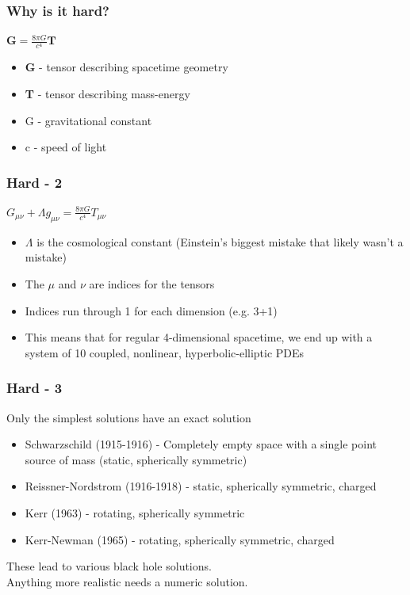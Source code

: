 \documentclass{beamer}
\begin{document}
\begin{frame}
  \frametitle{Why is it hard?}
  \begin{LARGE}
  \begin{center}
    $ \textbf{G} = \frac{8 \pi G}{c^4} \textbf{T} $
  \end{center}
  \end{LARGE}
  \begin{itemize}
    \item \textbf{G} - tensor describing spacetime geometry
    \item \textbf{T} - tensor describing mass-energy
    \item G - gravitational constant
    \item c - speed of light
  \end{itemize}
\end{frame}

\begin{frame}
  \frametitle{Hard - 2}
  \begin{LARGE}
  \begin{center}
    $ G_{\mu \nu} + \Lambda g_{\mu \nu} = \frac{8 \pi G}{c^4} T_{\mu \nu} $
  \end{center}
  \end{LARGE}
  \begin{itemize}
    \item  $\Lambda$ is the cosmological constant (Einstein's biggest mistake that likely wasn't a mistake)
    \item The $\mu$ and $\nu$ are indices for the tensors
    \item Indices run through 1 for each dimension (e.g. 3+1)
    \item This means that for regular 4-dimensional spacetime, we end up with a system of 10 coupled, nonlinear, hyperbolic-elliptic PDEs
  \end{itemize}
\end{frame}

\begin{frame}
  \frametitle{Hard - 3}
  Only the simplest solutions have an exact solution
  \begin{itemize}
    \item Schwarzschild (1915-1916) - Completely empty space with a single point source of mass (static, spherically symmetric)
    \item Reissner-Nordstrom (1916-1918) - static, spherically symmetric, charged
    \item Kerr (1963) - rotating, spherically symmetric
    \item Kerr-Newman (1965) - rotating, spherically symmetric, charged 
  \end{itemize}
  These lead to various black hole solutions. \\
  Anything more realistic needs a numeric solution.
\end{frame}
\end{document}
